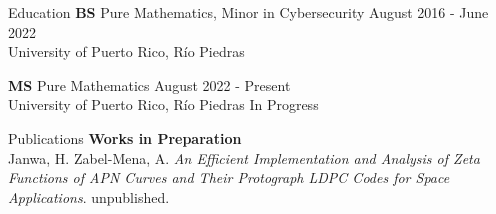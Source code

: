 \documentclass{resume} %
\begin{document}
\begin{rSection}{Education}
    \textbf{BS} \hspace*{10mm} Pure Mathematics, Minor in Cybersecurity
    \hspace{20mm} \hfill{August 2016 - June 2022} \\
     \hspace*{17mm} University of Puerto Rico, R\'io Piedras

    \textbf{MS} \hspace*{10mm} Pure Mathematics
    \hfill{August 2022 - Present} \\
    \hspace*{17mm} University of Puerto Rico, R\'io Piedras \hspace*{32mm} In
     Progress
\end{rSection}



\begin{rSection}{Publications}
    \textbf{Works in Preparation} \\
    \hspace*{10mm} Janwa, H. Zabel-Mena, A. \textit{An Efficient Implementation
      and Analysis of Zeta Functions of APN Curves and Their Protograph LDPC
      Codes for Space Applications}.
    \hspace*{10mm} unpublished.
\end{rSection}

\end{document}
